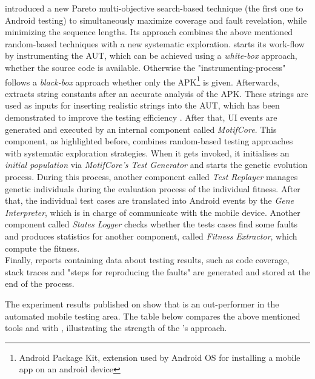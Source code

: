 \sapienz \cite{sapienz} introduced a new Pareto multi-objective search-based technique (the first one to Android testing) to simultaneously maximize coverage and fault revelation, while minimizing the sequence lengths. Its approach combines the above mentioned random-based techniques with a new systematic exploration. \sapienz starts its work-flow by instrumenting the AUT, which can be achieved using a \textit{white-box} approach, whether the source code is available. Otherwise the "instrumenting-process" follows a \textit{black-box} approach whether only the APK\footnote{Android Package Kit, extension used by Android OS for installing a mobile app on an android device} is given.  
Afterwards, \sapienz extracts string constants after an accurate analysis of the APK. These strings are used as inputs for inserting realistic strings into the AUT, which has been demonstrated to improve the testing efficiency \cite{sapienz}. After that, UI events are generated and executed by an internal component called \textit{MotifCore}. 
This component, as highlighted before, combines random-based testing approaches with systematic exploration strategies. When it gets invoked, it initialises an \textit{initial population} via \textit{MotifCore's Test Generator} and starts the genetic evolution process. 
During this process, another component called \textit{Test Replayer} manages genetic individuals during the evaluation process of the individual fitness. After that, the individual test cases are translated into Android events by the \textit{Gene Interpreter}, which is in charge of communicate with the mobile device. 
Another component called \textit{States Logger} checks whether the tests cases find some faults and produces statistics for another component, called \textit{Fitness Extractor}, which compute the fitness. \\
Finally, reports containing data about testing results, such as code coverage, stack traces and "steps for reproducing the faults" are generated and stored at the end of the process.  


The experiment results published on \cite{sapienz} show that \sapienz is an out-performer in the automated mobile testing area. The table below compares the above mentioned tools \monkey and \dynodroid with \sapienz, illustrating the strength of the \sapienz's approach. 

